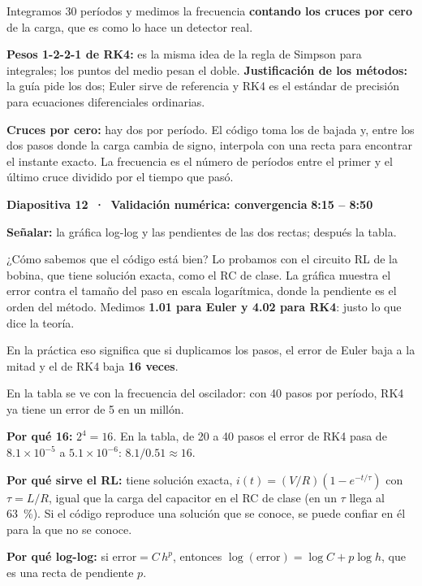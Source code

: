 \documentclass[11pt,a4paper]{article}
\newcommand{\diapo}[3]{%
  \par\vspace{8pt}
  {\large\bfseries Diapositiva #1 \,·\, #2}\hfill{\normalsize\bfseries\color{AzulIcesi} #3}\par
  \vspace{1pt}}
\newcommand{\senala}[1]{{\small\color{AzulIcesi}\textbf{Señalar:} #1}\par}
\begin{document}
Integramos 30 períodos y medimos la frecuencia \textbf{contando los cruces por cero} de la carga, que es como lo
hace un detector real.

\begin{nota}
\textbf{Pesos 1-2-2-1 de RK4:} es la misma idea de la regla de Simpson para integrales; los puntos del medio pesan
el doble. \textbf{Justificación de los métodos:} la guía pide los dos; Euler sirve de referencia y RK4 es el
estándar de precisión para ecuaciones diferenciales ordinarias.

\textbf{Cruces por cero:} hay dos por período. El código toma los de bajada y, entre los dos pasos donde la carga
cambia de signo, interpola con una recta para encontrar el instante exacto. La frecuencia es el número de períodos
entre el primer y el último cruce dividido por el tiempo que pasó.
\end{nota}

\diapo{12}{Validación numérica: convergencia}{8:15 -- 8:50}
\senala{la gráfica log-log y las pendientes de las dos rectas; después la tabla.}

¿Cómo sabemos que el código está bien? Lo probamos con el circuito RL de la bobina, que tiene solución exacta, como
el RC de clase. La gráfica muestra el error contra el tamaño del paso en escala logarítmica, donde la pendiente es
el orden del método. Medimos \textbf{1.01 para Euler y 4.02 para RK4}: justo lo que dice la teoría.

En la práctica eso significa que si duplicamos los pasos, el error de Euler baja a la mitad y el de RK4 baja
\textbf{16 veces}.

\begin{opcional}
En la tabla se ve con la frecuencia del oscilador: con 40 pasos por período, RK4 ya tiene un error de 5 en un
millón.
\end{opcional}

\begin{nota}
\textbf{Por qué 16:} $2^4 = 16$. En la tabla, de 20 a 40 pasos el error de RK4 pasa de $8.1\times10^{-5}$ a
$5.1\times10^{-6}$: $8.1/0.51 \approx 16$.

\textbf{Por qué sirve el RL:} tiene solución exacta, $i(t) = (V/R)(1-e^{-t/\tau})$ con $\tau = L/R$, igual que la
carga del capacitor en el RC de clase (en un $\tau$ llega al 63~\%). Si el código reproduce una solución que se
conoce, se puede confiar en él para la que no se conoce.

\textbf{Por qué log-log:} si $\text{error} = C\,h^p$, entonces $\log(\text{error}) = \log C + p\log h$, que es una
recta de pendiente $p$.
\end{nota}
\end{document}
